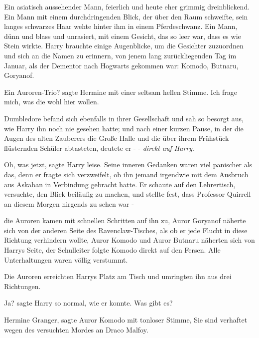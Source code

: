 Ein asiatisch aussehender Mann, feierlich und heute eher grimmig dreinblickend.
Ein Mann mit einem durchdringenden Blick, der über den Raum schweifte, sein
langes schwarzes Haar wehte hinter ihm in einem Pferdeschwanz. Ein Mann, dünn
und blass und unrasiert, mit einem Gesicht, das so leer war, dass es wie Stein
wirkte. Harry brauchte einige Augenblicke, um die Gesichter zuzuordnen und sich
an die Namen zu erinnern, von jenem lang zurückliegenden Tag im Januar, als der
Dementor nach Hogwarts gekommen war: Komodo, Butnaru, Goryanof.

\glqq{}Ein Auroren-Trio?\grqq{} sagte Hermine mit einer seltsam hellen Stimme.
\glqq{}Ich frage mich, was die wohl hier wollen.\grqq{}

Dumbledore befand sich ebenfalls in ihrer Gesellschaft und sah so besorgt aus,
wie Harry ihn noch nie gesehen hatte; und nach einer kurzen Pause, in der die
Augen des alten Zauberers die Große Halle und die über ihrem Frühstück
flüsternden Schüler abtasteten, deutete er - -\emph{ direkt auf Harry}.

\glqq{}Oh, was jetzt\grqq{}, sagte Harry leise. Seine inneren Gedanken waren viel
panischer als das, denn er fragte sich verzweifelt, ob ihn jemand irgendwie mit
dem Ausbruch aus Askaban in Verbindung gebracht hatte. Er schaute auf den
Lehrertisch, versuchte, den Blick beiläufig zu machen, und stellte fest, dass
Professor Quirrell an diesem Morgen nirgends zu sehen war -

die Auroren kamen mit schnellen Schritten auf ihn zu, Auror Goryanof näherte
sich von der anderen Seite des Ravenclaw-Tisches, als ob er jede Flucht in diese
Richtung verhindern wollte, Auror Komodo und Auror Butnaru näherten sich von
Harrys Seite, der Schulleiter folgte Komodo direkt auf den Fersen. Alle
Unterhaltungen waren völlig verstummt.

Die Auroren erreichten Harrys Platz am Tisch und umringten ihn aus drei
Richtungen.

\glqq{}Ja?\grqq{} sagte Harry so normal, wie er konnte. \glqq{}Was gibt es?\grqq{}

\glqq{}Hermine Granger\grqq{}, sagte Auror Komodo mit tonloser Stimme, \glqq{}Sie
sind verhaftet wegen des versuchten Mordes an Draco Malfoy.\grqq{}

